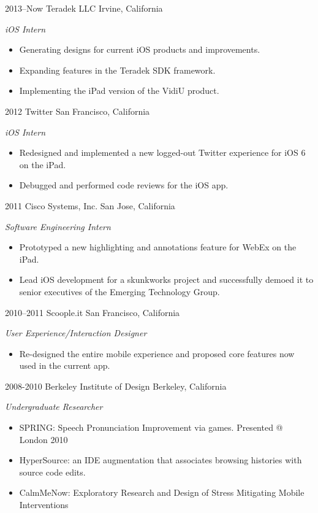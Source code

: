\documentclass[]{friggeri-cv} %
\begin{document}
\begin{entrylist}
\entry
{2013--Now}
{Teradek LLC}
{Irvine, California}
{\emph{iOS Intern}
\begin{itemize}
\item Generating designs for current iOS products and improvements.
\item Expanding features in the Teradek SDK framework.
\item Implementing the iPad version of the VidiU product.
\end{itemize}}
\entry
{2012}
{Twitter}
{San Francisco, California}
{\emph{iOS Intern}
\begin{itemize}
\item Redesigned and implemented a new logged-out Twitter experience for iOS 6 on the iPad.
\item Debugged and performed code reviews for the iOS app.
\end{itemize}}
\entry
{2011}
{Cisco Systems, Inc.}
{San Jose, California}
{\emph{Software Engineering Intern}
\begin{itemize}
\item Prototyped a new highlighting and annotations feature for WebEx on the iPad.
\item Lead iOS development for a skunkworks project and successfully demoed it to senior executives of the Emerging
Technology Group.
\end{itemize}}
\entry
{2010--2011}
{Scoople.it}
{San Francisco, California}
{\emph{User Experience/Interaction Designer} 
\begin{itemize}
\item Re-designed the entire mobile experience and proposed core features now used in the current app.
\end{itemize}}
\entry
{2008-2010}
{Berkeley Institute of Design}
{Berkeley, California}
{\emph{Undergraduate Researcher} 
\begin{itemize}
\item SPRING: Speech Pronunciation Improvement via games. Presented @ London 2010
\item HyperSource: an IDE augmentation that associates browsing histories with source code edits. 
\item CalmMeNow: Exploratory Research and Design of Stress Mitigating Mobile Interventions
\end{itemize}}
\end{entrylist}
\end{document}
